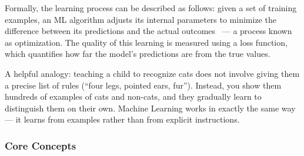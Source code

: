 Formally, the learning process can be described as follows: given a set of training examples, an ML algorithm adjusts its internal parameters to minimize the difference between its predictions and the actual outcomes~\cite{bishop2006pattern} --- a process known as optimization. The quality of this learning is measured using a loss function, which quantifies how far the model's predictions are from the true values.


A helpful analogy: teaching a child to recognize cats does not involve giving them a precise list of rules (``four legs, pointed ears, fur''). Instead, you show them hundreds of examples of cats and non-cats, and they gradually learn to distinguish them on their own. Machine Learning works in exactly the same way --- it learns from examples rather than from explicit instructions.

\subsubsection*{Core Concepts}

